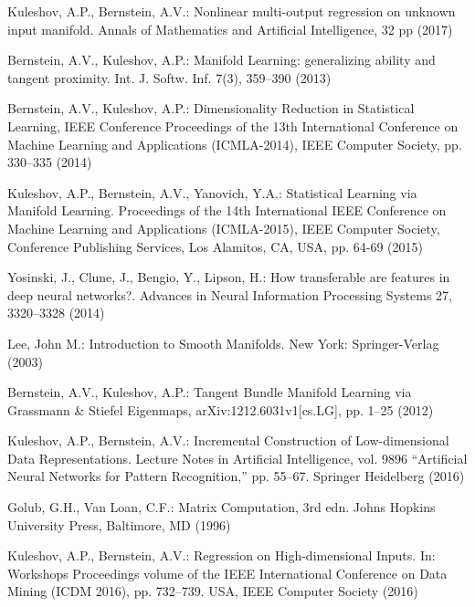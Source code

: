 \documentclass[conference]{IEEEtran} %
\begin{document}
\begin{thebibliography}{100}
Kuleshov, A.P., Bernstein, A.V.: Nonlinear multi-output regression on unknown input manifold. Annals of Mathematics and Artificial Intelligence, 32 pp (2017)

Bernstein, A.V., Kuleshov, A.P.: Manifold Learning: generalizing ability and tangent proximity. Int. J. Softw. Inf. 7(3), 359--390 (2013)

Bernstein, A.V., Kuleshov, A.P.: Dimensionality Reduction in Statistical Learning, IEEE Conference Proceedings of the 13th International Conference on Machine Learning and Applications (ICMLA-2014), IEEE Computer Society, pp. 330–335 (2014)

Kuleshov, A.P., Bernstein, A.V., Yanovich, Y.A.: Statistical Learning via Manifold Learning. Proceedings of the 14th International IEEE Conference on Machine Learning and Applications (ICMLA-2015), IEEE Computer Society, Conference Publishing Services, Los Alamitos, CA, USA, pp. 64-69 (2015)

Yosinski, J., Clune, J., Bengio, Y., Lipson, H.: How transferable are features in deep neural networks?.
Advances in Neural Information Processing Systems 27,
3320--3328 (2014)


Lee, John M.: Introduction to Smooth Manifolds. New York: Springer-Verlag (2003)

Bernstein, A.V., Kuleshov, A.P.: Tangent Bundle Manifold Learning via Grassmann \& Stiefel Eigenmaps, arXiv:1212.6031v1[cs.LG], pp. 1–25 (2012)

Kuleshov, A.P., Bernstein, A.V.: Incremental Construction of Low-dimensional Data Representations. Lecture Notes in Artificial Intelligence, vol. 9896 ``Artificial Neural Networks for Pattern Recognition,'' pp. 55--67. Springer Heidelberg (2016)

Golub, G.H., Van Loan, C.F.: Matrix Computation, 3rd edn. Johns Hopkins University Press, Baltimore, MD (1996)

Kuleshov, A.P., Bernstein, A.V.: Regression on High-dimensional Inputs. In: Workshops Proceedings volume of the IEEE International Conference on Data Mining (ICDM 2016), pp. 732--739. USA, IEEE Computer Society (2016)











































\end{thebibliography}
\end{document}
